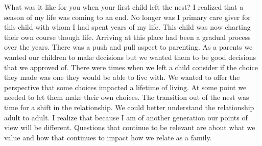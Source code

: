 
What was it like for you when your first child left the nest?
I realized that a season of my life was coming to an end. No longer was I primary care giver for this child with whom I had spent years of my life. This child was now charting their own course though life. Arriving at this place had been a gradual process over the years. There was a push and pull aspect to parenting. As a parents we wanted our children to make decisions but we wanted them to be good decisions that we approved of. There were times when we left a child consider if the choice they made was one they would be able to live with. We wanted to offer the perspective that some choices impacted a lifetime of living. At some point we needed to let them make their own choices. 
The transition out of the nest was time for a shift in the relationship. We could better understand the relationship adult to adult. I realize that because I am of another generation our points of view will be different. Questions that continue to be relevant are about what we value and how that continues to impact how we relate as a family.





